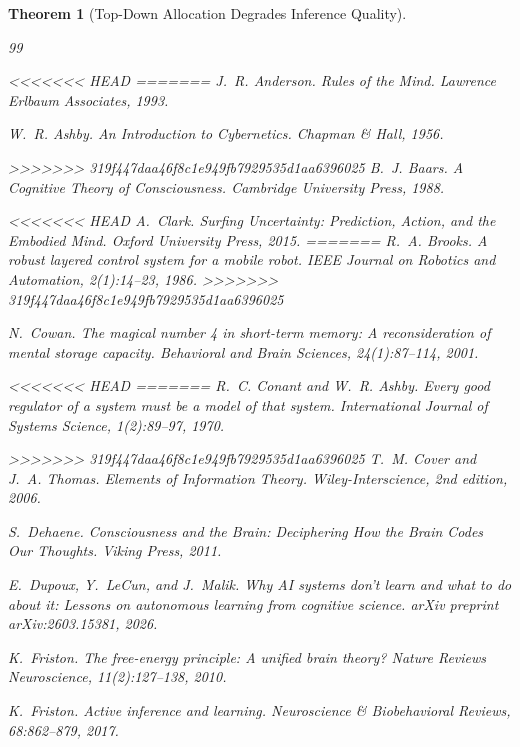 \documentclass[11pt]{article}
\newtheorem{theorem}{Theorem}
\theoremstyle{definition}
\begin{document}
\begin{theorem}[Top-Down Allocation Degrades Inference Quality]

\begin{thebibliography}{99}

<<<<<<< HEAD
=======
J.~R. Anderson.
\newblock \emph{Rules of the Mind}.
\newblock Lawrence Erlbaum Associates, 1993.

W.~R. Ashby.
\newblock \emph{An Introduction to Cybernetics}.
\newblock Chapman \& Hall, 1956.

>>>>>>> 319f447daa46f8c1e949fb7929535d1aa6396025
B.~J. Baars.
\newblock \emph{A Cognitive Theory of Consciousness}.
\newblock Cambridge University Press, 1988.

<<<<<<< HEAD
A.~Clark.
\newblock \emph{Surfing Uncertainty: Prediction, Action, and the Embodied
  Mind}.
\newblock Oxford University Press, 2015.
=======
R.~A. Brooks.
\newblock A robust layered control system for a mobile robot.
\newblock \emph{IEEE Journal on Robotics and Automation}, 2(1):14--23, 1986.
>>>>>>> 319f447daa46f8c1e949fb7929535d1aa6396025

N.~Cowan.
\newblock The magical number 4 in short-term memory: A reconsideration of
  mental storage capacity.
\newblock \emph{Behavioral and Brain Sciences}, 24(1):87--114, 2001.

<<<<<<< HEAD
=======
R.~C. Conant and W.~R. Ashby.
\newblock Every good regulator of a system must be a model of that system.
\newblock \emph{International Journal of Systems Science}, 1(2):89--97, 1970.

>>>>>>> 319f447daa46f8c1e949fb7929535d1aa6396025
T.~M. Cover and J.~A. Thomas.
\newblock \emph{Elements of Information Theory}.
\newblock Wiley-Interscience, 2nd edition, 2006.

S.~Dehaene.
\newblock \emph{Consciousness and the Brain: Deciphering How the Brain Codes
  Our Thoughts}.
\newblock Viking Press, 2011.

E.~Dupoux, Y.~LeCun, and J.~Malik.
\newblock Why {AI} systems don't learn and what to do about it: Lessons on
  autonomous learning from cognitive science.
\newblock \emph{arXiv preprint arXiv:2603.15381}, 2026.

K.~Friston.
\newblock The free-energy principle: A unified brain theory?
\newblock \emph{Nature Reviews Neuroscience}, 11(2):127--138, 2010.

K.~Friston.
\newblock Active inference and learning.
\newblock \emph{Neuroscience \& Biobehavioral Reviews}, 68:862--879, 2017.


\end{thebibliography}
\end{theorem}
\end{document}
